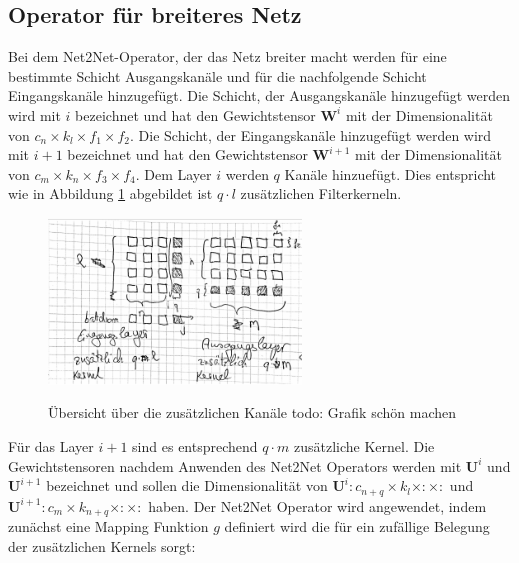 \subsection{Operator für breiteres Netz}
\color{blue1}
Bei dem Net2Net-Operator, der das Netz breiter macht werden für eine bestimmte Schicht Ausgangskanäle und für die nachfolgende Schicht Eingangskanäle hinzugefügt. Die Schicht, der Ausgangskanäle hinzugefügt werden wird mit $i$ bezeichnet und hat den Gewichtstensor $\mathbf{W}^i$ mit der Dimensionalität von $c_n \times k_l \times f_1 \times f_2$. Die Schicht, der Eingangskanäle hinzugefügt werden wird mit $i+1$ bezeichnet und hat den Gewichtstensor $\mathbf{W}^{i+1}$ mit der Dimensionalität von $c_m \times k_n \times f_3 \times f_4$. Dem Layer $i$ werden $q$ Kanäle hinzuefügt. Dies entspricht wie in Abbildung \ref{abb:channels} abgebildet ist $q \cdot l $ zusätzlichen Filterkerneln. 

\begin{figure}[h]
 \centering
 \includegraphics[width=0.6\textwidth]{KapitelPartA/images/channels.png}
 \label{abb:channels}
 \caption{Übersicht über die zusätzlichen Kanäle todo: Grafik schön machen}
\end{figure}



Für das Layer $i+1$ sind es entsprechend $q \cdot m $ zusätzliche Kernel. Die Gewichtstensoren nachdem Anwenden des Net2Net Operators werden mit $\mathbf{U}^i$ und $\mathbf{U}^{i+1}$ bezeichnet und sollen die Dimensionalität von $\mathbf{U}^i: c_{n+q} \times k_l \times : \times :$ und $\mathbf{U}^{i+1}: c_m \times k_{n+q} \times : \times :$ haben. Der Net2Net Operator wird angewendet, indem zunächst eine Mapping Funktion $g$ definiert wird die für ein zufällige Belegung der zusätzlichen Kernels sorgt:

